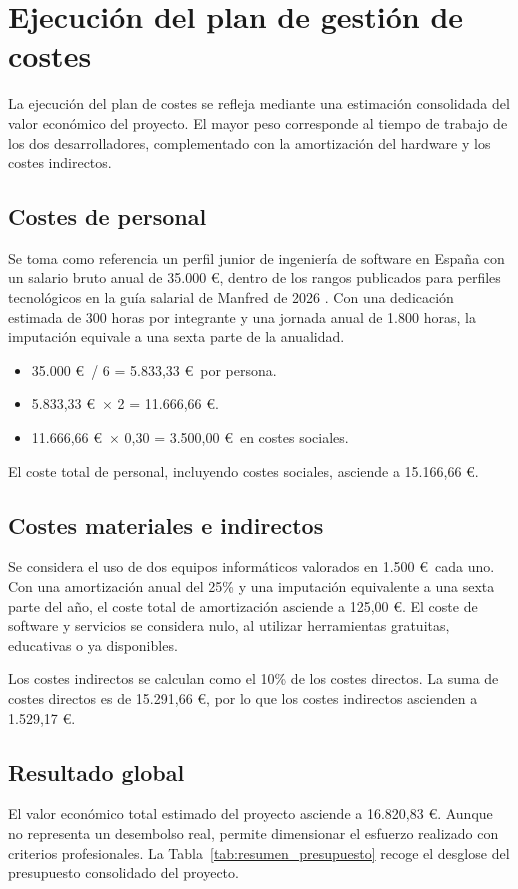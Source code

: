 \section{Ejecución del plan de gestión de costes}
La ejecución del plan de costes se refleja mediante una estimación consolidada del valor
económico del proyecto. El mayor peso corresponde al tiempo de trabajo de los dos
desarrolladores, complementado con la amortización del hardware y los costes indirectos.

\subsection{Costes de personal}
Se toma como referencia un perfil junior de ingeniería de software en España con un salario
bruto anual de 35.000 \euro, dentro de los rangos publicados para perfiles tecnológicos en
la guía salarial de Manfred de 2026 \cite{manfredGuiaSalarial2026}. Con una dedicación
estimada de 300 horas por integrante y una jornada anual de 1.800 horas, la imputación
equivale a una sexta parte de la anualidad.

\begin{itemize}
    \item 35.000 \euro\ / 6 = 5.833,33 \euro\ por persona.
    \item 5.833,33 \euro\ $\times$ 2 = 11.666,66 \euro.
    \item 11.666,66 \euro\ $\times$ 0,30 = 3.500,00 \euro\ en costes sociales.
\end{itemize}

El coste total de personal, incluyendo costes sociales, asciende a 15.166,66 \euro.

\subsection{Costes materiales e indirectos}
Se considera el uso de dos equipos informáticos valorados en 1.500 \euro\ cada uno. Con una
amortización anual del 25\% y una imputación equivalente a una sexta parte del año, el coste
total de amortización asciende a 125,00 \euro. El coste de software y servicios se considera
nulo, al utilizar herramientas gratuitas, educativas o ya disponibles.

Los costes indirectos se calculan como el 10\% de los costes directos. La suma de costes
directos es de 15.291,66 \euro, por lo que los costes indirectos ascienden a
1.529,17 \euro.

\subsection{Resultado global}
El valor económico total estimado del proyecto asciende a 16.820,83 \euro. Aunque no
representa un desembolso real, permite dimensionar el esfuerzo realizado con criterios
profesionales. La Tabla~\ref{tab:resumen_presupuesto} recoge el desglose del presupuesto
consolidado del proyecto.

